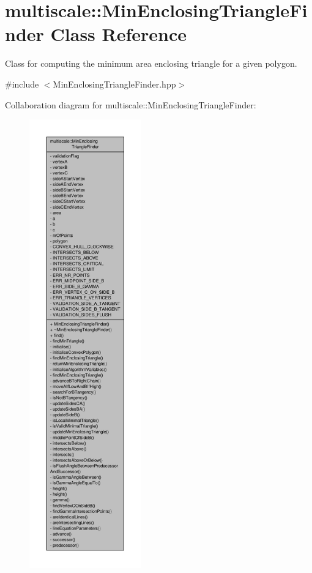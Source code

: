\hypertarget{classmultiscale_1_1MinEnclosingTriangleFinder}{\section{multiscale\-:\-:\-Min\-Enclosing\-Triangle\-Finder \-Class \-Reference}
\label{classmultiscale_1_1MinEnclosingTriangleFinder}
}


\-Class for computing the minimum area enclosing triangle for a given polygon.  




{\ttfamily \#include $<$\-Min\-Enclosing\-Triangle\-Finder.\-hpp$>$}



\-Collaboration diagram for multiscale\-:\-:\-Min\-Enclosing\-Triangle\-Finder\-:
\nopagebreak
\begin{figure}[H]
\begin{center}
\leavevmode
\includegraphics[height=550pt]{classmultiscale_1_1MinEnclosingTriangleFinder__coll__graph}
\end{center}
\end{figure}
